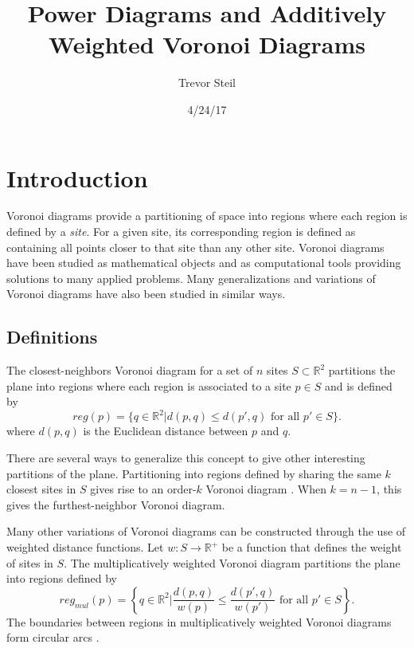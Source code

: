 \documentclass[12pt]{article}
\title{Power Diagrams and Additively Weighted Voronoi Diagrams }
\date{4/24/17}
\author{Trevor Steil}
\newcommand{\R}{\mathbb{R}}
\begin{document}
\maketitle

\section{Introduction}
Voronoi diagrams provide a partitioning of space into regions where each region is defined by a \textit{site}. For a given site, its corresponding
region is defined as containing all points closer to that site than any other site. Voronoi diagrams have been studied as mathematical objects and as
computational tools providing solutions to many applied problems. Many generalizations and variations of Voronoi diagrams have also been studied in
similar ways.

\subsection{Definitions}

The closest-neighbors Voronoi diagram for a set of $n$ sites $S \subset \R^2$ partitions the plane into regions where each region is associated to a
site $p \in S$ and is defined by
\begin{equation*}
  reg(p) = \{ q \in \R^2 | d(p,q) \leq d(p',q) \text{ for all } p' \in S \} .
\end{equation*}
where $d(p,q)$ is the Euclidean distance between $p$ and $q$.

There are several ways to generalize this concept to give other interesting partitions of the plane. Partitioning into regions defined by sharing the
same $k$ closest sites in $S$ gives rise to an order-$k$ Voronoi diagram \cite{aurenhammer_survey}. When $k=n-1$, this gives the furthest-neighbor
Voronoi diagram.

Many other variations of Voronoi diagrams can be constructed through the use of weighted distance functions. Let $w: S \to \R^+$ be a function that defines
the weight of sites in $S$. The multiplicatively weighted Voronoi diagram partitions the plane into regions defined by
\begin{equation*}
  reg_{mul}(p) = \left\{ q \in \R^2 | \frac{d(p,q)}{w(p)} \leq \frac{d(p',q)}{w(p')} \text{ for all } p' \in S \right\}.
\end{equation*}
The boundaries between regions in multiplicatively weighted Voronoi diagrams form circular arcs \cite{ash-bolker}.
\end{document}
